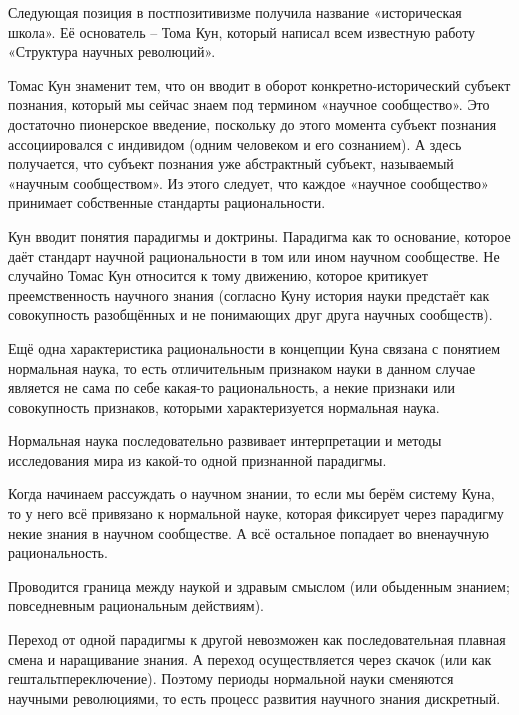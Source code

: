 \documentclass[exam_answers.tex]{subfiles}
\begin{document}
\renewcommand{\baselinestretch}{0.75}

Следующая позиция в постпозитивизме получила название «историческая школа». Её основатель – Тома Кун, который написал всем известную работу «Структура научных революций».

Томас Кун знаменит тем, что он вводит в оборот конкретно-исторический субъект познания, который мы сейчас знаем под термином «научное сообщество».
Это достаточно пионерское введение, поскольку до этого момента субъект познания ассоциировался с индивидом (одним человеком и его сознанием).
А здесь получается, что субъект познания уже абстрактный субъект, называемый «научным сообществом».
Из этого следует, что каждое «научное сообщество» принимает собственные стандарты рациональности.

Кун вводит понятия парадигмы и доктрины.
Парадигма как то основание, которое даёт стандарт научной рациональности в том или ином научном сообществе.
Не случайно Томас Кун относится к тому движению, которое критикует преемственность научного знания (согласно Куну история науки предстаёт как совокупность разобщённых и не понимающих друг друга научных сообществ).

Ещё одна характеристика рациональности в концепции Куна связана с понятием нормальная наука, то есть отличительным признаком науки в данном случае является не сама по себе какая-то рациональность, а некие признаки или совокупность признаков, которыми характеризуется нормальная наука.

Нормальная наука последовательно развивает интерпретации и методы исследования мира из какой-то одной признанной парадигмы.

Когда начинаем рассуждать о научном знании, то если мы берём систему Куна, то у него всё привязано к нормальной науке, которая фиксирует через парадигму некие знания в научном сообществе.
А всё остальное попадает во вненаучную рациональность.

 Проводится граница между наукой и здравым смыслом (или обыденным знанием; повседневным рациональным действиям).
 
Переход от одной парадигмы к другой невозможен как последовательная плавная смена и наращивание знания.
А переход осуществляется через скачок (или как гештальтпереключение).
Поэтому периоды нормальной науки сменяются научными революциями, то есть процесс развития научного знания дискретный.
\\
\end{document}
